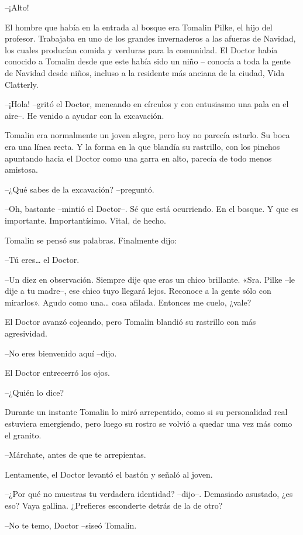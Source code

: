 --¡Alto!

El hombre que había en la entrada al bosque era Tomalin Pilke, el hijo del profesor. Trabajaba en uno de los grandes invernaderos a las afueras de Navidad, los cuales producían comida y verduras para la comunidad. El Doctor había conocido a Tomalin desde que este había sido un niño – conocía a toda la gente de Navidad desde niños, incluso a la residente más anciana de la ciudad, Vida Clatterly.

--¡Hola! --gritó el Doctor, meneando en círculos y con entusiasmo una pala en el aire--. He venido a ayudar con la excavación.

Tomalin era normalmente un joven alegre, pero hoy no parecía estarlo. Su boca era una línea recta. Y la forma en la que blandía su rastrillo, con los pinchos apuntando hacia el Doctor como una garra en alto, parecía de todo menos amistosa.

--¿Qué sabes de la excavación? --preguntó.

--Oh, bastante --mintió el Doctor--. Sé que está ocurriendo. En el bosque. Y que es importante. Importantísimo. Vital, de hecho.

Tomalin se pensó sus palabras. Finalmente dijo:

--Tú eres… el Doctor.

--Un diez en observación. Siempre dije que eras un chico brillante. «Sra. Pilke --le dije a tu madre--, ese chico tuyo llegará lejos. Reconoce a la gente sólo con mirarlos». Agudo como una… cosa afilada. Entonces me cuelo, ¿vale?

El Doctor avanzó cojeando, pero Tomalin blandió su rastrillo con más agresividad.

--No eres bienvenido aquí --dijo.

El Doctor entrecerró los ojos.

--¿Quién lo dice?

Durante un instante Tomalin lo miró arrepentido, como si su personalidad real estuviera emergiendo, pero luego su rostro se volvió a quedar una vez más como el granito.

--Márchate, antes de que te arrepientas.

Lentamente, el Doctor levantó el bastón y señaló al joven.

--¿Por qué no muestras tu verdadera identidad? --dijo--. Demasiado asustado, ¿es eso? Vaya gallina. ¿Prefieres esconderte detrás de la de otro?

--No te temo, Doctor --siseó Tomalin.

